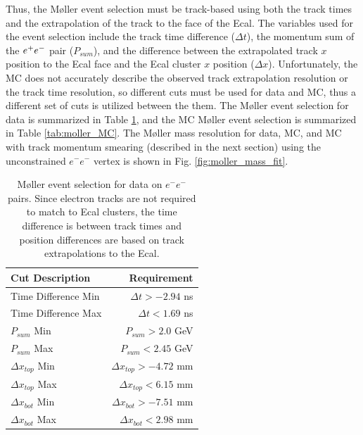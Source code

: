 Thus, the M\o ller event selection must be track-based using both the track times and the extrapolation of the track to the face of the Ecal. The variables used for the event selection include the track time difference ($\Delta t$), the momentum sum of the $e^{+}e^{-}$ pair ($P_{sum}$), and the difference between the extrapolated track $x$ position to the Ecal face and the Ecal cluster $x$ position ($\Delta x$). Unfortunately, the MC does not accurately describe the observed track extrapolation resolution or the track time resolution, so different cuts must be used for data and MC, thus a different set of cuts is utilized between the them. The M\o ller event selection for data is summarized in Table \ref{tab:moller_data}, and the MC M\o ller event selection is summarized in Table \ref{tab:moller_MC}. The M\o ller mass resolution for data, MC, and MC with track momentum smearing (described in the next section) using the unconstrained $e^-e^-$ vertex is shown in Fig. \ref{fig:moller_mass_fit}.

\begin{table}[t] 
    \centering
    \begin{tabular}{lr}
        \toprule
        \textbf{Cut Description} & \textbf{Requirement} \\
        \midrule
        Time Difference Min & $\Delta t>-2.94$ ns\\
        Time Difference Max & $\Delta t<1.69$ ns\\
        $P_{sum}$ Min & $P_{sum}>2.0$ GeV\\
        $P_{sum}$ Max & $P_{sum}<2.45$ GeV\\
        $\Delta x_{top}$ Min & $\Delta x_{top}>-4.72$ mm\\
        $\Delta x_{top}$ Max & $\Delta x_{top}<6.15$ mm\\
        $\Delta x_{bot}$ Min & $\Delta x_{bot}>-7.51$ mm\\
        $\Delta x_{bot}$ Max & $\Delta x_{bot}<2.98$ mm\\
        \bottomrule
    \end{tabular}
    \caption{M\o ller event selection for data on $e^-e^-$ pairs. Since electron tracks are not required to match to Ecal clusters, the time difference is between track times and position differences are based on track extrapolations to the Ecal.}
    \label{tab:moller_data}
\end{table}


